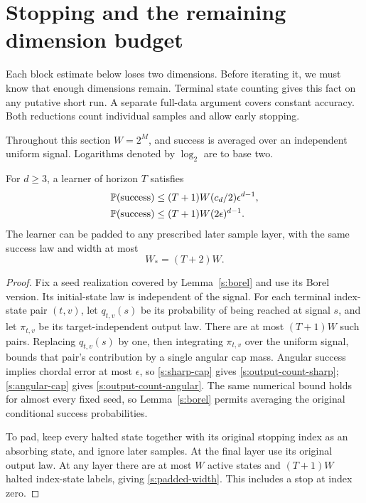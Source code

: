 \section{Stopping and the remaining dimension budget}\label{s:stopping}

Each block estimate below loses two dimensions. Before iterating it,
we must know that enough dimensions remain. Terminal state counting
gives this fact on any putative short run. A separate full-data
argument covers constant accuracy. Both reductions count individual
samples and allow early stopping.

Throughout this section \(W=2^M\), and success is averaged over an
independent uniform signal. Logarithms denoted by \(\log_2\) are to
base two.

\begin{lemma}\label{s:terminal-count}
For \(d\ge3\), a learner of horizon \(T\) satisfies
\begin{align}
 \mathbb P(\mathrm{success})
 &\le (T+1)W(c_d/2)\epsilon^{d-1},\label{s:output-count-sharp}\\
 \mathbb P(\mathrm{success})
 &\le (T+1)W(2\epsilon)^{d-1}.\label{s:output-count-angular}
\end{align}
The learner can be padded to any prescribed later sample layer, with
the same success law and width at most
\begin{equation}\label{s:padded-width}
 W_*=(T+2)W.
\end{equation}
\end{lemma}
\begin{proof}
Fix a seed realization covered by Lemma~\ref{s:borel} and use its
Borel version. Its initial-state law is independent of the signal.
For each terminal index-state pair \((t,v)\), let \(q_{t,v}(s)\)
be its probability of being reached at signal \(s\), and let
\(\pi_{t,v}\) be its target-independent output law. There are at most
\((T+1)W\) such pairs. Replacing \(q_{t,v}(s)\) by one, then integrating
\(\pi_{t,v}\) over the uniform signal, bounds that pair's contribution
by a single angular cap mass. Angular success implies chordal error
at most \(\epsilon\), so \eqref{s:sharp-cap} gives
\eqref{s:output-count-sharp}; \eqref{s:angular-cap} gives
\eqref{s:output-count-angular}. The same numerical
bound holds for almost every fixed seed, so Lemma~\ref{s:borel}
permits averaging the original conditional success probabilities.

To pad, keep every halted state together with its original stopping
index as an absorbing state, and ignore later samples. At the final
layer use its original output law. At any layer there are at most
\(W\) active states and \((T+1)W\) halted index-state labels,
giving \eqref{s:padded-width}. This includes a stop at index zero.
\end{proof}

